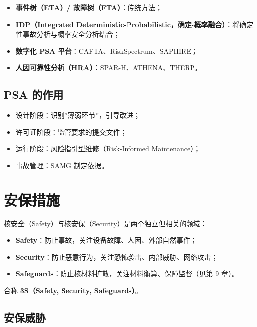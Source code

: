 \documentclass[
  UTF8,
  scheme=plain,
  fontsize=10pt,
  openany
]{ctexbook}
\begin{document}
\begin{itemize}
\tightlist
\item
  \textbf{事件树（ETA）/ 故障树（FTA）}：传统方法；
\item
  \textbf{IDP（Integrated
  Deterministic-Probabilistic，确定-概率融合）}：将确定性事故分析与概率安全分析结合；
\item
  \textbf{数字化 PSA 平台}：CAFTA、RiskSpectrum、SAPHIRE；
\item
  \textbf{人因可靠性分析（HRA）}：SPAR-H、ATHENA、THERP。
\end{itemize}

\subsection{PSA 的作用}\label{psa-ux7684ux4f5cux7528}

\begin{itemize}
\tightlist
\item
  设计阶段：识别''薄弱环节''，引导改进；
\item
  许可证阶段：监管要求的提交文件；
\item
  运行阶段：风险指引型维修（Risk-Informed Maintenance）；
\item
  事故管理：SAMG 制定依据。
\end{itemize}

\section{安保措施}\label{ux5b89ux4fddux63aaux65bd}

核安全（Safety）与核安保（Security）是两个独立但相关的领域：

\begin{itemize}
\tightlist
\item
  \textbf{Safety}：防止事故，关注设备故障、人因、外部自然事件；
\item
  \textbf{Security}：防止恶意行为，关注恐怖袭击、内部威胁、网络攻击；
\item
  \textbf{Safeguards}：防止核材料扩散，关注材料衡算、保障监督（见第 9
  章）。
\end{itemize}

合称 \textbf{3S（Safety, Security, Safeguards）}。

\subsection{安保威胁}\label{ux5b89ux4fddux5a01ux80c1}
\end{document}
